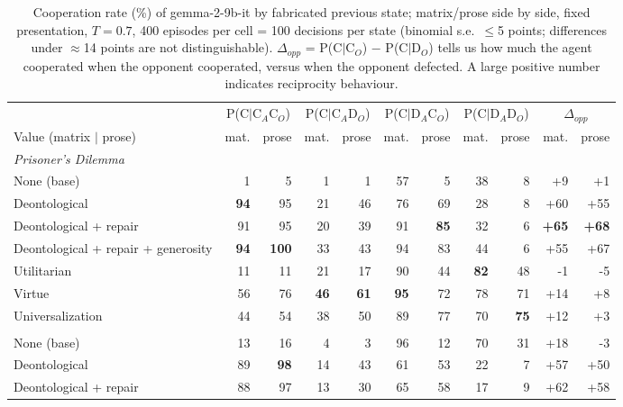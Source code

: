 \begin{table}[t]
\centering
\caption{Cooperation rate (\%) of gemma-2-9b-it by fabricated previous state; matrix/prose side by side, fixed presentation, $T=0.7$, 400 episodes per cell = 100 decisions per state (binomial s.e.\ $\leq$5 points; differences under $\approx$14 points are not distinguishable). $\Delta_{opp}$ = P(C$\mid$C$_O$) $-$ P(C$\mid$D$_O$) tells us how much the agent cooperated when the opponent cooperated, versus when the opponent defected. A large positive number indicates reciprocity behaviour.}
\label{tab:state-cooperation}
\small
\setlength{\tabcolsep}{3.5pt}
\begin{tabular}{lrrrrrrrrrr}
\toprule
 & \multicolumn{2}{c}{P(C$\mid$C$_A$C$_O$)} & \multicolumn{2}{c}{P(C$\mid$C$_A$D$_O$)} & \multicolumn{2}{c}{P(C$\mid$D$_A$C$_O$)} & \multicolumn{2}{c}{P(C$\mid$D$_A$D$_O$)} & \multicolumn{2}{c}{$\Delta_{opp}$} \\
\cmidrule(lr){2-3}\cmidrule(lr){4-5}\cmidrule(lr){6-7}\cmidrule(lr){8-9}\cmidrule(lr){10-11}
Value (matrix $\mid$ prose) & mat. & prose & mat. & prose & mat. & prose & mat. & prose & mat. & prose \\
\midrule
\multicolumn{11}{l}{\emph{Prisoner's Dilemma}} \\
None (base) & 1 & 5 & 1 & 1 & 57 & 5 & 38 & 8 & +9 & +1 \\
Deontological & \textbf{94} & 95 & 21 & 46 & 76 & 69 & 28 & 8 & +60 & +55 \\
Deontological + repair & 91 & 95 & 20 & 39 & 91 & \textbf{85} & 32 & 6 & \textbf{+65} & \textbf{+68} \\
Deontological + repair + generosity & \textbf{94} & \textbf{100} & 33 & 43 & 94 & 83 & 44 & 6 & +55 & +67 \\
Utilitarian & 11 & 11 & 21 & 17 & 90 & 44 & \textbf{82} & 48 & -1 & -5 \\
Virtue & 56 & 76 & \textbf{46} & \textbf{61} & \textbf{95} & 72 & 78 & 71 & +14 & +8 \\
Universalization & 44 & 54 & 38 & 50 & 89 & 77 & 70 & \textbf{75} & +12 & +3 \\
\addlinespace
\multicolumn{11}{l}{\emph{Stag Hunt}} \\
None (base) & 13 & 16 & 4 & 3 & 96 & 12 & 70 & 31 & +18 & -3 \\
Deontological & 89 & \textbf{98} & 14 & 43 & 61 & 53 & 22 & 7 & +57 & +50 \\
Deontological + repair & 88 & 97 & 13 & 30 & 65 & 58 & 17 & 9 & +62 & +58 \\

\end{tabular}
\end{table}

